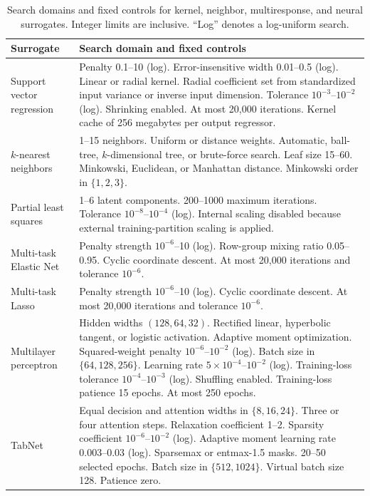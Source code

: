 \begin{table}[htbp]
\centering\small
\caption{Search domains and fixed controls for kernel, neighbor, multiresponse, and neural surrogates. Integer limits are inclusive. ``Log'' denotes a log-uniform search.}\label{tab:surrogate_search_domains_other}
\begin{tabular}{p{2.65cm}p{9.2cm}}
\toprule
Surrogate & Search domain and fixed controls\\
\midrule
Support vector regression & Penalty 0.1--10 (log). Error-insensitive width 0.01--0.5 (log). Linear or radial kernel. Radial coefficient set from standardized input variance or inverse input dimension. Tolerance $10^{-3}$--$10^{-2}$ (log). Shrinking enabled. At most 20,000 iterations. Kernel cache of 256 megabytes per output regressor.\\
$k$-nearest neighbors & 1--15 neighbors. Uniform or distance weights. Automatic, ball-tree, $k$-dimensional tree, or brute-force search. Leaf size 15--60. Minkowski, Euclidean, or Manhattan distance. Minkowski order in $\{1,2,3\}$.\\
Partial least squares & 1--6 latent components. 200--1000 maximum iterations. Tolerance $10^{-8}$--$10^{-4}$ (log). Internal scaling disabled because external training-partition scaling is applied.\\
Multi-task Elastic Net & Penalty strength $10^{-6}$--10 (log). Row-group mixing ratio 0.05--0.95. Cyclic coordinate descent. At most 20,000 iterations and tolerance $10^{-6}$.\\
Multi-task Lasso & Penalty strength $10^{-6}$--10 (log). Cyclic coordinate descent. At most 20,000 iterations and tolerance $10^{-6}$.\\
Multilayer perceptron & Hidden widths $(128,64,32)$. Rectified linear, hyperbolic tangent, or logistic activation. Adaptive moment optimization. Squared-weight penalty $10^{-6}$--$10^{-2}$ (log). Batch size in $\{64,128,256\}$. Learning rate $5\times10^{-4}$--$10^{-2}$ (log). Training-loss tolerance $10^{-4}$--$10^{-3}$ (log). Shuffling enabled. Training-loss patience 15 epochs. At most 250 epochs.\\
TabNet & Equal decision and attention widths in $\{8,16,24\}$. Three or four attention steps. Relaxation coefficient 1--2. Sparsity coefficient $10^{-6}$--$10^{-2}$ (log). Adaptive moment learning rate 0.003--0.03 (log). Sparsemax or entmax-1.5 masks. 20--50 selected epochs. Batch size in $\{512,1024\}$. Virtual batch size 128. Patience zero.\\
\bottomrule
\end{tabular}
\end{table}


